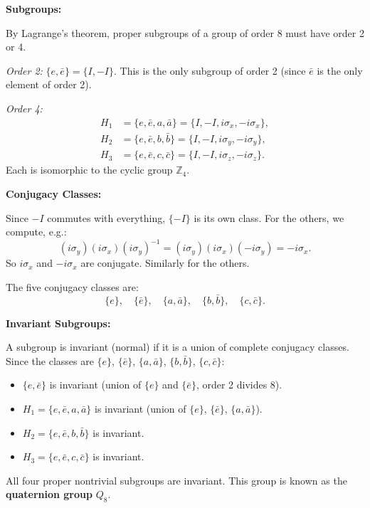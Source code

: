 \documentclass[12pt]{article}
\begin{document}
\medskip
\noindent\textbf{Subgroups:}

By Lagrange's theorem, proper subgroups of a group of order 8 must have order 2 or 4.

\textit{Order 2:} $\{e, \bar{e}\} = \{I, -I\}$. This is the only subgroup of order 2 (since $\bar{e}$ is the only element of order 2).

\textit{Order 4:}
\begin{align*}
H_1 &= \{e, \bar{e}, a, \bar{a}\} = \{I, -I, i\sigma_x, -i\sigma_x\}, \\
H_2 &= \{e, \bar{e}, b, \bar{b}\} = \{I, -I, i\sigma_y, -i\sigma_y\}, \\
H_3 &= \{e, \bar{e}, c, \bar{c}\} = \{I, -I, i\sigma_z, -i\sigma_z\}.
\end{align*}
Each is isomorphic to the cyclic group $\mathbb{Z}_4$.

\medskip
\noindent\textbf{Conjugacy Classes:}

Since $-I$ commutes with everything, $\{-I\}$ is its own class. For the others, we compute, e.g.:
\[
(i\sigma_y)(i\sigma_x)(i\sigma_y)^{-1} = (i\sigma_y)(i\sigma_x)(-i\sigma_y) = -i\sigma_x.
\]
So $i\sigma_x$ and $-i\sigma_x$ are conjugate. Similarly for the others.

The five conjugacy classes are:
\[
\{e\}, \quad \{\bar{e}\}, \quad \{a, \bar{a}\}, \quad \{b, \bar{b}\}, \quad \{c, \bar{c}\}.
\]

\medskip
\noindent\textbf{Invariant Subgroups:}

A subgroup is invariant (normal) if it is a union of complete conjugacy classes. Since the classes are $\{e\}$, $\{\bar{e}\}$, $\{a,\bar{a}\}$, $\{b,\bar{b}\}$, $\{c,\bar{c}\}$:

\begin{itemize}
\item $\{e, \bar{e}\}$ is invariant (union of $\{e\}$ and $\{\bar{e}\}$, order 2 divides 8). \checkmark
\item $H_1 = \{e, \bar{e}, a, \bar{a}\}$ is invariant (union of $\{e\}$, $\{\bar{e}\}$, $\{a,\bar{a}\}$). \checkmark
\item $H_2 = \{e, \bar{e}, b, \bar{b}\}$ is invariant. \checkmark
\item $H_3 = \{e, \bar{e}, c, \bar{c}\}$ is invariant. \checkmark
\end{itemize}

All four proper nontrivial subgroups are invariant. This group is known as the \textbf{quaternion group} $Q_8$.
\end{document}
